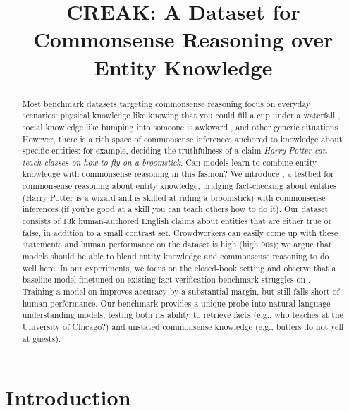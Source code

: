 \title{CREAK: A Dataset for Commonsense Reasoning over Entity Knowledge}



\maketitle

\begin{abstract}
Most benchmark datasets targeting commonsense reasoning focus on everyday scenarios: physical knowledge like knowing that you could fill a cup under a waterfall \citep{Alon_Talmor_2019}, social knowledge like bumping into someone is awkward \citep{Maarten_Sap_20219}, and other generic situations. However, there is a rich space of commonsense inferences anchored to knowledge about specific entities: for example, deciding the truthfulness of a claim \emph{Harry Potter can teach classes on how to fly on a broomstick}. Can models learn to combine entity knowledge with commonsense reasoning in this fashion? We introduce \oursno, a testbed for commonsense reasoning about entity knowledge, bridging fact-checking about entities (Harry Potter is a wizard and is skilled at riding a broomstick) with commonsense inferences (if you're good at a skill you can teach others how to do it). Our dataset consists of 13k human-authored English claims about entities that are either true or false, in addition to a small contrast set.
Crowdworkers can easily come up with these statements and human performance on the dataset is high (high 90s); we argue that models should be able to blend entity knowledge and commonsense reasoning to do well here. In our experiments, we focus on the closed-book setting and observe that a baseline model finetuned on existing fact verification benchmark struggles on \oursno. Training a model on \ours improves accuracy by a substantial margin, but still falls short of human performance. Our benchmark provides a unique probe into natural language understanding models, testing both its ability to retrieve facts (e.g., who teaches at the University of Chicago?) and unstated commonsense knowledge (e.g., butlers do not yell at guests).  
\end{abstract}

\section{Introduction}

